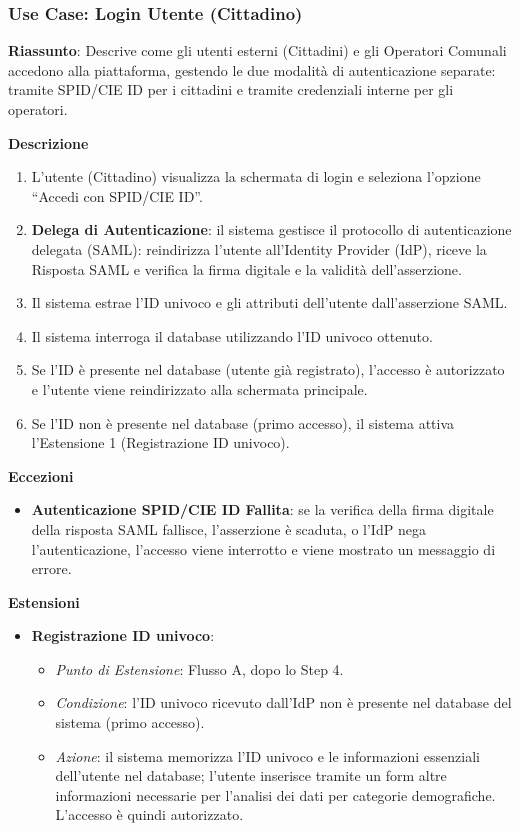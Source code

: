 \documentclass{article}
\begin{document}
\subsubsection*{Use Case: Login Utente (Cittadino)}

\textbf{Riassunto}: Descrive come gli utenti esterni (Cittadini) e gli Operatori Comunali accedono alla piattaforma, gestendo le due modalità di autenticazione separate: tramite SPID/CIE ID per i cittadini e tramite credenziali interne per gli operatori.

\textbf{Descrizione}
\begin{enumerate}
    \item L'utente (Cittadino) visualizza la schermata di login e seleziona l'opzione ``Accedi con SPID/CIE ID''.
    \item \textbf{Delega di Autenticazione}: il sistema gestisce il protocollo di autenticazione delegata (SAML): reindirizza l'utente all'Identity Provider (IdP), riceve la Risposta SAML e verifica la firma digitale e la validità dell'asserzione.
    \item Il sistema estrae l'ID univoco e gli attributi dell'utente dall'asserzione SAML.
    \item Il sistema interroga il database utilizzando l'ID univoco ottenuto.
    \item Se l'ID è presente nel database (utente già registrato), l'accesso è autorizzato e l'utente viene reindirizzato alla schermata principale.
    \item Se l'ID non è presente nel database (primo accesso), il sistema attiva l'Estensione 1 (Registrazione ID univoco).
\end{enumerate}

\textbf{Eccezioni}
\begin{itemize}
    \item \textbf{Autenticazione SPID/CIE ID Fallita}: se la verifica della firma digitale della risposta SAML fallisce, l'asserzione è scaduta, o l'IdP nega l'autenticazione, l'accesso viene interrotto e viene mostrato un messaggio di errore.
\end{itemize}

\textbf{Estensioni}
\begin{itemize}
    \item \textbf{Registrazione ID univoco}:
    \begin{itemize}
        \item \textit{Punto di Estensione}: Flusso A, dopo lo Step 4.
        \item \textit{Condizione}: l'ID univoco ricevuto dall'IdP non è presente nel database del sistema (primo accesso).
        \item \textit{Azione}: il sistema memorizza l'ID univoco e le informazioni essenziali dell'utente nel database; l'utente inserisce tramite un form altre informazioni necessarie per l'analisi dei dati per categorie demografiche. L'accesso è quindi autorizzato.
    \end{itemize}
\end{itemize}
\end{document}
